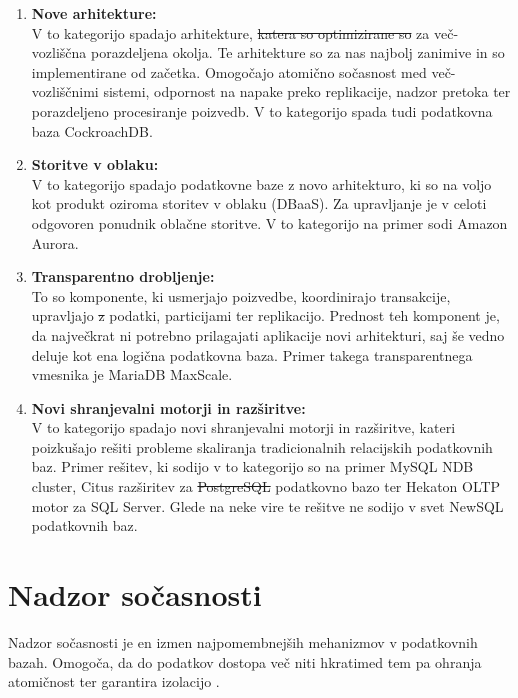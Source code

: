 \documentclass[a4paper, 12pt]{book}
\providecommand{\DIFaddtex}[1]{{\protect\color{blue}\uwave{#1}}} %
\providecommand{\DIFdeltex}[1]{{\protect\color{red}\sout{#1}}}                      %
\providecommand{\DIFaddbegin}{} %
\providecommand{\DIFaddend}{} %
\providecommand{\DIFdelbegin}{} %
\providecommand{\DIFdelend}{} %
\providecommand{\DIFadd}[1]{\texorpdfstring{\DIFaddtex{#1}}{#1}} %
\providecommand{\DIFdel}[1]{\texorpdfstring{\DIFdeltex{#1}}{}} %
\newcommand{\DIFscaledelfig}{0.5}
\newlength{\DIFdelgraphicswidth} %
\newlength{\DIFdelgraphicsheight} %
\newcommand{\DIFaddincludegraphics}[2][]{{\color{blue}\fbox{\DIFOincludegraphics[#1]{#2}}}} %
\newcommand{\DIFdelincludegraphics}[2][]{%
\sbox{\DIFdelgraphicsbox}{\DIFOincludegraphics[#1]{#2}}%
\settoboxwidth{\DIFdelgraphicswidth}{\DIFdelgraphicsbox} %
\settoboxtotalheight{\DIFdelgraphicsheight}{\DIFdelgraphicsbox} %
\scalebox{\DIFscaledelfig}{%
\parbox[b]{\DIFdelgraphicswidth}{\usebox{\DIFdelgraphicsbox}\\[-\baselineskip] \rule{\DIFdelgraphicswidth}{0em}}\llap{\resizebox{\DIFdelgraphicswidth}{\DIFdelgraphicsheight}{%
\setlength{\unitlength}{\DIFdelgraphicswidth}%
\begin{picture}(1,1)%
\thicklines\linethickness{2pt} %
{\color[rgb]{1,0,0}\put(0,0){\framebox(1,1){}}}%
{\color[rgb]{1,0,0}\put(0,0){\line( 1,1){1}}}%
{\color[rgb]{1,0,0}\put(0,1){\line(1,-1){1}}}%
\end{picture}%
}\hspace*{3pt}}} %
} %
\DeclareRobustCommand{\DIFaddbegin}{\DIFOaddbegin \let\includegraphics\DIFaddincludegraphics} %
\DeclareRobustCommand{\DIFaddend}{\DIFOaddend \let\includegraphics\DIFOincludegraphics} %
\DeclareRobustCommand{\DIFdelbegin}{\DIFOdelbegin \let\includegraphics\DIFdelincludegraphics} %
\DeclareRobustCommand{\DIFdelend}{\DIFOaddend \let\includegraphics\DIFOincludegraphics} %
\begin{document}
\begin{enumerate}
    \item \textbf{Nove arhitekture:}\\V to kategorijo spadajo arhitekture, \DIFdelbegin \DIFdel{katera so optimizirane so }\DIFdelend \DIFaddbegin \DIFadd{katere so optimizirane }\DIFaddend za več-vozliščna porazdeljena okolja. Te arhitekture so za nas najbolj zanimive in so implementirane od začetka. Omogočajo atomično sočasnost med več-vozliščnimi sistemi, odpornost na napake preko replikacije, nadzor pretoka ter porazdeljeno procesiranje poizvedb. V to kategorijo spada tudi podatkovna baza CockroachDB. \cite{Pavlo2016Sep}
    \item \textbf{Storitve v oblaku:}\\V to kategorijo spadajo podatkovne baze z novo arhitekturo, ki so na voljo kot produkt oziroma storitev v oblaku (DBaaS). Za upravljanje je v celoti odgovoren ponudnik oblačne storitve. V to kategorijo na primer sodi Amazon Aurora. \cite{Pavlo2016Sep}
    \item \textbf{Transparentno drobljenje:}\\To so komponente, ki usmerjajo poizvedbe, koordinirajo transakcije, upravljajo \DIFdelbegin \DIFdel{z }\DIFdelend \DIFaddbegin \DIFadd{s }\DIFaddend podatki, particijami ter replikacijo. Prednost teh komponent je, da največkrat ni potrebno prilagajati aplikacije novi arhitekturi, saj še vedno deluje kot ena logična podatkovna baza. Primer takega transparentnega vmesnika je MariaDB MaxScale. \cite{Pavlo2016Sep}
    \item \textbf{Novi shranjevalni motorji in razširitve:}\\V to kategorijo spadajo novi shranjevalni motorji in razširitve, kateri poizkušajo rešiti probleme skaliranja tradicionalnih relacijskih podatkovnih baz. \cite{Kumar2018Jun} Primer rešitev, ki sodijo v to kategorijo so na primer MySQL NDB cluster, Citus razširitev za \DIFdelbegin \DIFdel{PostgreSQL }\DIFdelend \DIFaddbegin \DIFadd{Postgres }\DIFaddend podatkovno bazo ter Hekaton OLTP motor za SQL Server. Glede na neke vire \cite{Pavlo2016Sep} te rešitve ne sodijo v svet NewSQL podatkovnih baz. 
\end{enumerate}

\section{Nadzor sočasnosti}
Nadzor sočasnosti je en izmen najpomembnejših mehanizmov v podatkovnih bazah. Omogoča, da do podatkov dostopa več niti hkrati\DIFaddbegin \DIFadd{, }\DIFaddend med tem pa ohranja atomičnost ter garantira izolacijo \cite{Pavlo2016Sep}.
\end{document}
